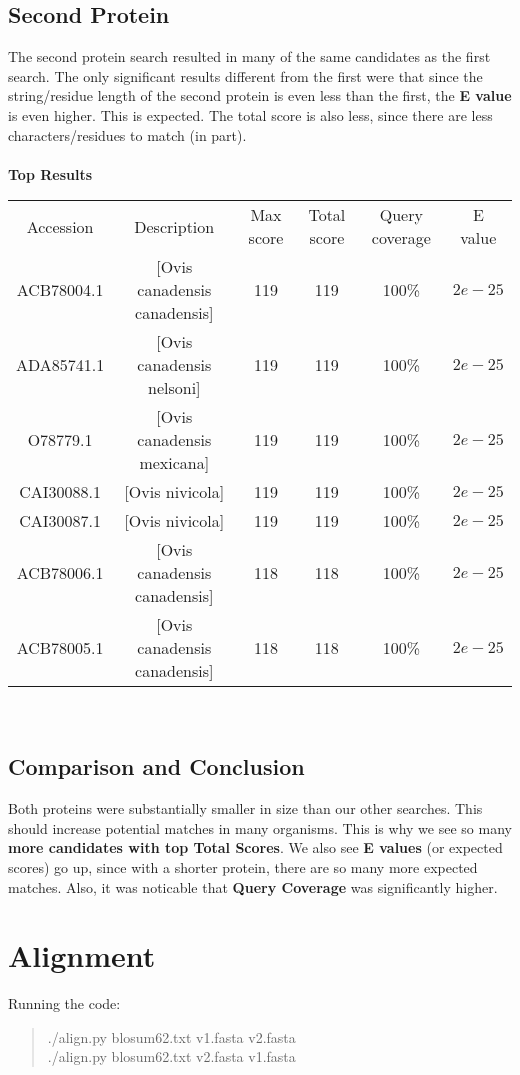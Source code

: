 \documentclass[12pt]{article}
\begin{document}
		\subsection{Second Protein}
		The second protein search resulted in many of the same candidates as the first search. The only significant results different from the first were that since the string/residue length of the second protein is even less than the first, the \textbf{E value} is even higher. This is expected. The total score is also less, since there are less characters/residues to match (in part).
		\\ \\
		\textbf{Top Results} \\
		\scriptsize
		\begin{tabular}{|c|c|c|c|c|c|}
			\hline
			Accession	&	Description	&	Max score	&	Total score	&	Query coverage	&	E value \\
			ACB78004.1	&	[Ovis canadensis canadensis]	&	119	&	119	&	100\%	&	$2e-25$ \\
			ADA85741.1	&	[Ovis canadensis nelsoni]	&	119	&	119	&	100\%	&	$2e-25$ \\
			O78779.1	&	[Ovis canadensis mexicana]	&	119	&	119	&	100\%	&	$2e-25$ \\
			CAI30088.1	&	[Ovis nivicola]	&	119	&	119	&	100\%	&	$2e-25$ \\
			CAI30087.1	&	[Ovis nivicola]	&	119	&	119	&	100\%	&	$2e-25$ \\
			ACB78006.1	&	[Ovis canadensis canadensis]	&	118	&	118	&	100\%	&	$2e-25$ \\
			ACB78005.1	&	[Ovis canadensis canadensis]	&	118	&	118	&	100\%	&	$2e-25$ \\
			\hline
		\end{tabular} \\
		\normalsize

		\subsection{Comparison and Conclusion}
		Both proteins were substantially smaller in size than our other searches. This should increase potential matches in many organisms. This is why we see so many \textbf{more candidates with top Total Scores}. We also see \textbf{E values} (or expected scores) go up, since with a shorter protein, there are so many more expected matches. Also, it was noticable that \textbf{Query Coverage} was significantly higher.


	\section{Alignment}
	Running the code:
	\begin{verse}
		./align.py blosum62.txt v1.fasta v2.fasta \\
		./align.py blosum62.txt v2.fasta v1.fasta
	\end{verse}
\end{document}
